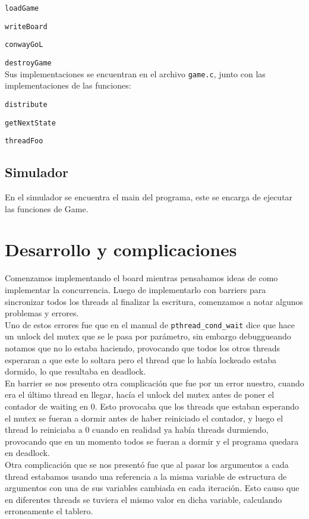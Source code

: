 \documentclass[]{article}
\begin{document}
\verb|loadGame|

\verb|writeBoard|

\verb|conwayGoL|

\verb|destroyGame|
\\
Sus implementaciones se encuentran en el archivo \verb|game.c|, junto con las implementaciones de las funciones:

\verb|distribute|

\verb|getNextState|

\verb|threadFoo|

\subsection{Simulador}
En el simulador se encuentra el main del programa, este se encarga de ejecutar las funciones de Game.

\newpage
\section{Desarrollo y complicaciones}
Comenzamos implementando el board mientras pensabamos ideas de como implementar la concurrencia. Luego de implementarlo con barriers para sincronizar todos los threads al finalizar la escritura, comenzamos a notar algunos problemas y errores.\\
Uno de estos errores fue que en el manual de \verb|pthread_cond_wait| dice que hace un unlock del mutex que se le pasa por parámetro, sin embargo debuggueando notamos que no lo estaba haciendo, provocando que todos los otros threads esperaran a que este lo soltara pero el thread que lo había lockeado estaba dormido, lo que resultaba en deadlock.\\
En barrier se nos presento otra complicación que fue por un error nuestro, cuando era el último thread en llegar, hacía el unlock del mutex antes de poner el contador de waiting en 0. Esto provocaba que los threads que estaban esperando el mutex se fueran a dormir antes de haber reiniciado el contador, y luego el thread lo reiniciaba a 0 cuando en realidad ya había threads durmiendo, provocando que en un momento todos se fueran a dormir y el programa quedara en deadlock.\\
Otra complicación que se nos presentó fue que al pasar los argumentos a cada thread estabamos usando una referencia a la misma variable de estructura de argumentos con una de sus variables cambiada en cada iteración. Esto causo que en diferentes threads se tuviera el mismo valor en dicha variable, calculando erroneamente el tablero.\\
\end{document}
